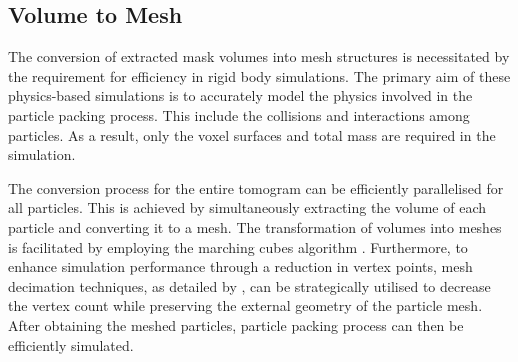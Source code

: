 \documentclass[preprint,12pt]{elsarticle}
\begin{document}
\subsection{Volume to Mesh}
The conversion of extracted mask volumes into mesh structures is necessitated by the requirement for efficiency in rigid body simulations. 
The primary aim of these physics-based simulations is to accurately model the physics involved in the particle packing process. 
This include the collisions and interactions among particles. 
As a result, only the voxel surfaces and total mass are required in the simulation. 
\par
The conversion process for the entire tomogram can be efficiently parallelised for all particles. 
This is achieved by simultaneously extracting the volume of each particle and converting it to a mesh.
The transformation of volumes into meshes is facilitated by employing the marching cubes algorithm \citep{lorensen1987marching}. 
Furthermore, to enhance simulation performance through a reduction in vertex points, mesh decimation techniques, as detailed by \citep{garland1997surface}, can be strategically utilised to decrease the vertex count while preserving the external geometry of the particle mesh. 
After obtaining the meshed particles, particle packing process can then be efficiently simulated. 


\end{document}
